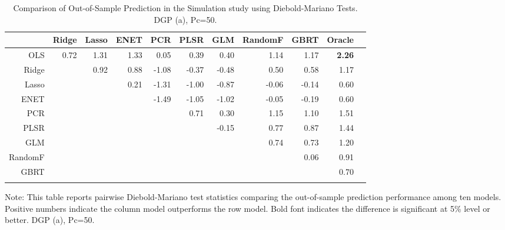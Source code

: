 \documentclass[11pt]{article}
\begin{document}
\begin{table}[H]
\begin{threeparttable}
\centering
\setlength{\tabcolsep}{5pt}
\caption{Comparison of Out-of-Sample Prediction in the Simulation study using Diebold-Mariano Tests. DGP (a), Pc=50.}
\centering
\begin{tabular}{r|rrrrrrrrrr}
  \Xhline{2\arrayrulewidth}
& Ridge & Lasso & ENET & PCR & PLSR & GLM & RandomF & GBRT & Oracle \\ 
  \hline
OLS & 0.72 & 1.31 & 1.33 & 0.05 & 0.39 & 0.40 & 1.14 & 1.17 & \textbf{2.26} \\ 
  Ridge  && 0.92 & 0.88 & -1.08 & -0.37 & -0.48 & 0.50 & 0.58 & 1.17 \\ 
  Lasso  &&& 0.21 & -1.31 & -1.00 & -0.87 & -0.06 & -0.14 & 0.60 \\ 
  ENET  &&&& -1.49 & -1.05 & -1.02 & -0.05 & -0.19 & 0.60 \\ 
  PCR  &&&&& 0.71 & 0.30 & 1.15 & 1.10 & 1.51 \\ 
  PLSR  &&&&&& -0.15 & 0.77 & 0.87 & 1.44 \\ 
  GLM &&&&&&& 0.74 & 0.73 & 1.20 \\ 
  RandomF  &&&&&&&& 0.06 & 0.91 \\ 
  GBRT &&&&&&&&& 0.70 \\ 
   \Xhline{2\arrayrulewidth}
\end{tabular}
\begin{tablenotes}
      \small
      \item Note: This table reports pairwise Diebold-Mariano test statistics comparing the out-of-sample prediction performance among ten models. Positive numbers indicate the column model outperforms the row model. Bold font indicates the difference is significant at 5\% level or better. DGP (a), Pc=50.
    \end{tablenotes}
  \end{threeparttable}
\label{table:dieboldsim1}
\end{table}

\end{document}
